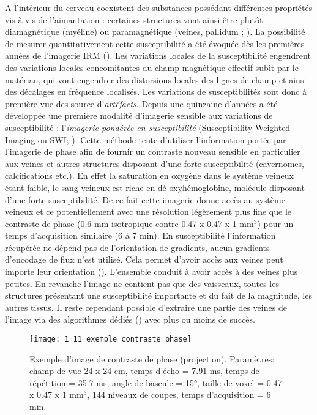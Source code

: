 A l’intérieur du cerveau coexistent des substances possédant différentes propriétés vis-à-vis de l'aimantation : certaines structures vont ainsi être plutôt diamagnétique (myéline) ou paramagnétique (veines, pallidum ; \cite{Wang_Liu_2014}). La possibilité de mesurer quantitativement cette susceptibilité a été évoquée dès les premières années de l’imagerie IRM (\cite{Young1987}). Les variations locales de la susceptibilité engendrent des variations locales concomitantes du champ magnétique effectif subit par le matériau, qui vont engendrer des distorsions locales des lignes de champ et ainsi des décalages en fréquence localisés. Les variations de susceptibilités sont donc à première vue des source d’{\em artéfacts}.  
Depuis une quinzaine d'années a été développée une première modalité d’imagerie sensible aux variations de susceptibilité : l’{\em imagerie pondérée en susceptibilité} (Susceptibility Weighted Imaging ou SWI; \cite{Reichenbach2001}). Cette méthode tente d’utiliser l’information portée par l’imagerie de phase afin de fournir un contraste nouveau sensible en particulier aux veines et autres structures disposant d’une forte susceptibilité (cavernomes, calcifications etc.). En effet la saturation en oxygène dans le système veineux étant faible, le sang veineux est riche en dé-oxyhémoglobine, molécule disposant d’une forte susceptibilité. De ce fait cette imagerie donne accès au système veineux et ce potentiellement avec une résolution légèrement plus fine que le contraste de phase (0.6 mm isotropique contre 0.47 x 0.47 x 1 mm$^3$) pour un temps d'acquisition similaire (6 à 7 min). En susceptibilité  l'information récupérée ne dépend pas de l'orientation de gradients, aucun gradients d'encodage de flux n'est utilisé. Cela permet d'avoir accès aux veines peut importe leur orientation (\cite{Fan2014}). L'ensemble conduit à avoir accès à des veines plus petites. En revanche l’image ne contient pas que des vaisseaux, toutes les structures présentant une susceptibilité importante et du fait de la magnitude, les autres tissus. Il reste cependant possible d’extraire une partie des veines de l’image via des algorithmes dédiés (\cite{Manniesing2006}) avec plus ou moins de succès.

\begin{figure}[!t]
\centering
\texttt{[image: 1\_11\_exemple\_contraste\_phase]}
\caption{Exemple d'image de contraste de phase (projection). Paramètres: champ de vue 24 x 24 cm, temps d’écho = 7.91 ms, temps de répétition = 35.7 ms, angle de bascule = 15°, taille de voxel = 0.47 x 0.47 x 1 mm$^3$, 144 niveaux de coupes, temps d'acquisition = 6 min.}
\label{fig:1_11_exemple_contraste_phase}	
\end{figure}

